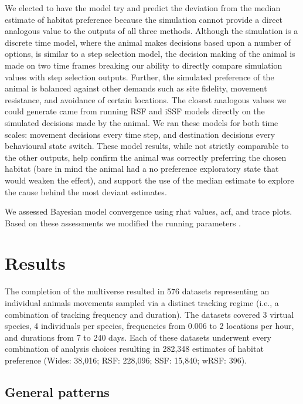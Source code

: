 \documentclass[10pt,a4paper]{article}
\begin{document}
We elected to have the model try and predict the deviation from the median estimate of habitat preference because the simulation cannot provide a direct analogous value to the outputs of all three methods.
Although the simulation is a discrete time model, where the animal makes decisions based upon a number of options, is similar to a step selection model, the decision making of the animal is made on two time frames breaking our ability to directly compare simulation values with step selection outputs.
Further, the simulated preference of the animal is balanced against other demands such as site fidelity, movement resistance, and avoidance of certain locations.
The closest analogous values we could generate came from running RSF and iSSF models directly on the simulated decisions made by the animal.
We ran these models for both time scales: movement decisions every time step, and destination decisions every behavioural state switch.
These model results, while not strictly comparable to the other outputs, help confirm the animal was correctly preferring the chosen habitat (bare in mind the animal had a no preference exploratory state that would weaken the effect), and support the use of the median estimate to explore the cause behind the most deviant estimates.

We assessed Bayesian model convergence using rhat values, acf, and trace plots.
Based on these assessments we modified the running parameters .

\hypertarget{results}{%
\section{Results}\label{results}}

The completion of the multiverse resulted in 576 datasets representing an individual animals movements sampled via a distinct tracking regime (i.e., a combination of tracking frequency and duration).
The datasets covered 3 virtual species, 4 individuals per species, frequencies from 0.006 to 2 locations per hour, and durations from 7 to 240 days.
Each of these datasets underwent every combination of analysis choices resulting in
282,348 estimates of habitat preference (Wides: 38,016; RSF: 228,096; SSF: 15,840; wRSF: 396).

\hypertarget{general-patterns}{%
\subsection{General patterns}\label{general-patterns}}
\end{document}
